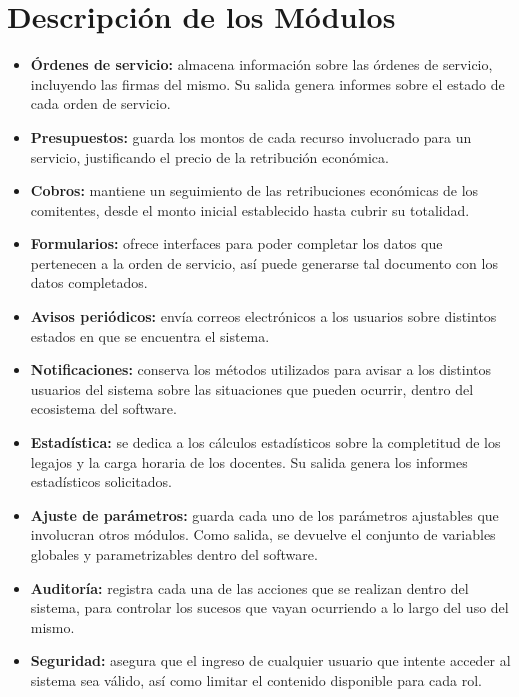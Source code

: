 \section*{Descripci\'on de los M\'odulos}
\begin{itemize}
	\item \textbf{\'Ordenes de servicio:}
	almacena informaci\'on sobre las \'ordenes
	de servicio, incluyendo las firmas del mismo.
	Su salida genera informes sobre el estado de
	cada orden de servicio.
	\item \textbf{Presupuestos:} guarda los
	montos de cada recurso involucrado para un
	servicio, justificando el precio de la
	retribuci\'on econ\'omica.
	\item \textbf{Cobros:} mantiene un seguimiento
	de las retribuciones econ\'omicas de los
	comitentes, desde el monto inicial establecido
	hasta cubrir su totalidad.
	\item \textbf{Formularios:} ofrece interfaces
	para poder completar los	datos que pertenecen
	a la orden de servicio, as\'i puede generarse
	tal documento con los datos completados.
	\item \textbf{Avisos peri\'odicos:} env\'ia
	correos electr\'onicos a los usuarios sobre
	distintos estados en que se encuentra el
	sistema.
	\item \textbf{Notificaciones:} conserva los
	m\'etodos utilizados para avisar a los
	distintos usuarios del sistema sobre las
	situaciones que pueden ocurrir, dentro del
	ecosistema del software.
	\item \textbf{Estad\'istica:} se dedica a los
	c\'alculos estad\'isticos sobre la completitud
	de los legajos y la carga horaria de los
	docentes. Su salida genera los informes
	estad\'isticos solicitados.
	\item \textbf{Ajuste de par\'ametros:} guarda
	cada uno de los par\'ametros ajustables que
	involucran otros m\'odulos. Como salida, se
	devuelve el conjunto de variables globales y
	parametrizables dentro del software.
	\item \textbf{Auditor\'ia:} registra cada una
	de las acciones que se realizan dentro del
	sistema, para controlar los sucesos que vayan
	ocurriendo a lo largo del uso del mismo.
	\item \textbf{Seguridad:} asegura que el
	ingreso de cualquier usuario que intente
	acceder al sistema sea v\'alido, as\'i como
	limitar el contenido disponible para cada rol.
\end{itemize}
\newpage
